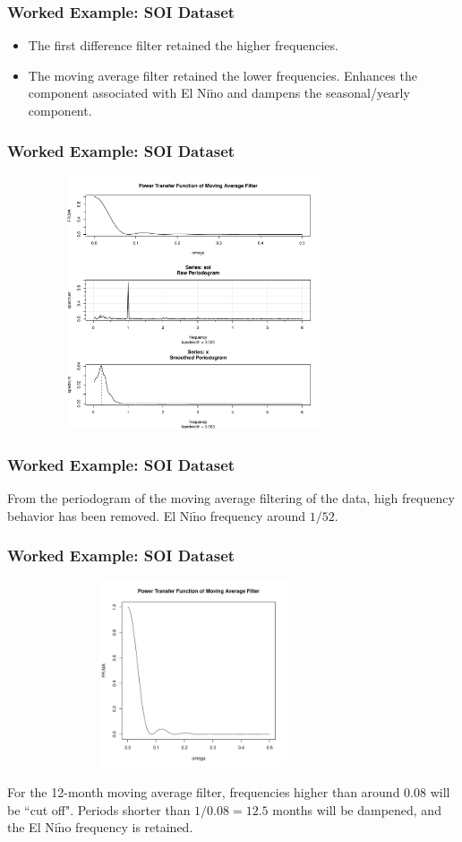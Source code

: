 \documentclass[%
xcolor=pdftex]{beamer}
\begin{document}
\begin{frame}
\frametitle{Worked Example: SOI Dataset}

\begin{itemize}
\item The first difference filter retained the higher frequencies.
\item The moving average filter retained the lower frequencies. Enhances the component associated with El Ni$\tilde{\text{n}}$o and dampens the seasonal/yearly component.
\end{itemize}

\end{frame}

\begin{frame}
\frametitle{Worked Example: SOI Dataset}

\includegraphics[width=110mm, height=75mm]{raw.pdf}

\end{frame}



\begin{frame}
\frametitle{Worked Example: SOI Dataset}

From the periodogram of the moving average filtering of the data, high frequency behavior has been removed. El Ni$\tilde{\text{n}}$o frequency around $1/52$. 

\end{frame}





\begin{frame}
\frametitle{Worked Example: SOI Dataset}

\includegraphics[width=110mm, height=55mm]{ma.pdf}

For the 12-month moving average filter, frequencies higher than around 0.08 will be ``cut off". Periods shorter than $1/0.08 = 12.5$ months will be dampened, and the El Ni$\tilde{\text{n}}$o frequency is retained.

\end{frame}
\end{document}
